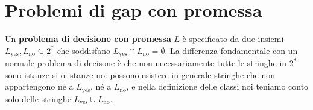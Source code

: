 \documentclass[\main/main.tex]{subfiles}
\begin{document}
\section{Problemi di gap con promessa}
\begin{multicols}{2}
\begin{definition}
    Un \textbf{problema di decisione con promessa} \(L\) è specificato da due insiemi \(L_{\text{yes}}, L_{\text{no}} \subseteq 2^*\) che soddisfano \(L_{\text{yes}} \cap L_{\text{no}} = \emptyset\). La differenza fondamentale con un normale problema di decisone è che non necessariamente tutte le stringhe in \(2^*\) sono istanze si o istanze no: possono esistere in generale stringhe che non appartengono né a \(L_{\text{yes}}\), né a \(L_{\text{no}}\), e nella definizione delle classi noi teniamo conto solo delle stringhe \(L_{\text{yes}} \cup L_{\text{no}}\).
    

\end{definition}
\end{multicols}
\end{document}
